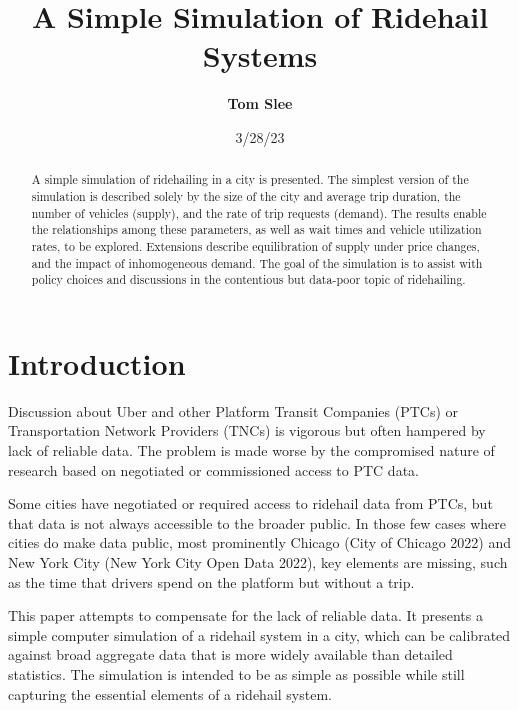 \documentclass[
  letterpaper,
]{article}
\title{A Simple Simulation of Ridehail Systems}
\author{
\textbf{Tom Slee}\\}
\date{3/28/23}
\renewcommand*\contentsname{Table of contents}
\newcommand\contentsname{Table of contents}
\begin{document}
\maketitle
\begin{abstract}
A simple simulation of ridehailing in a city is presented. The simplest
version of the simulation is described solely by the size of the city
and average trip duration, the number of vehicles (supply), and the rate
of trip requests (demand). The results enable the relationships among
these parameters, as well as wait times and vehicle utilization rates,
to be explored. Extensions describe equilibration of supply under price
changes, and the impact of inhomogeneous demand. The goal of the
simulation is to assist with policy choices and discussions in the
contentious but data-poor topic of ridehailing.
\end{abstract}
\ifdefined\Shaded\renewenvironment{Shaded}{\begin{tcolorbox}[boxrule=0pt, frame hidden, borderline west={3pt}{0pt}{shadecolor}, enhanced, sharp corners, breakable, interior hidden]}{\end{tcolorbox}}\fi

\renewcommand*\contentsname{Contents}
{
\hypersetup{linkcolor=}
\setcounter{tocdepth}{3}
\tableofcontents
}
\hypertarget{introduction}{%
\section{Introduction}\label{introduction}}

Discussion about Uber and other Platform Transit Companies (PTCs) or
Transportation Network Providers (TNCs) is vigorous but often hampered
by lack of reliable data. The problem is made worse by the compromised
nature of research based on negotiated or commissioned access to PTC
data.

Some cities have negotiated or required access to ridehail data from
PTCs, but that data is not always accessible to the broader public. In
those few cases where cities do make data public, most prominently
Chicago (City of Chicago 2022) and New York City (New York City Open
Data 2022), key elements are missing, such as the time that drivers
spend on the platform but without a trip.

This paper attempts to compensate for the lack of reliable data. It
presents a simple computer simulation of a ridehail system in a city,
which can be calibrated against broad aggregate data that is more widely
available than detailed statistics. The simulation is intended to be as
simple as possible while still capturing the essential elements of a
ridehail system.
\end{document}
